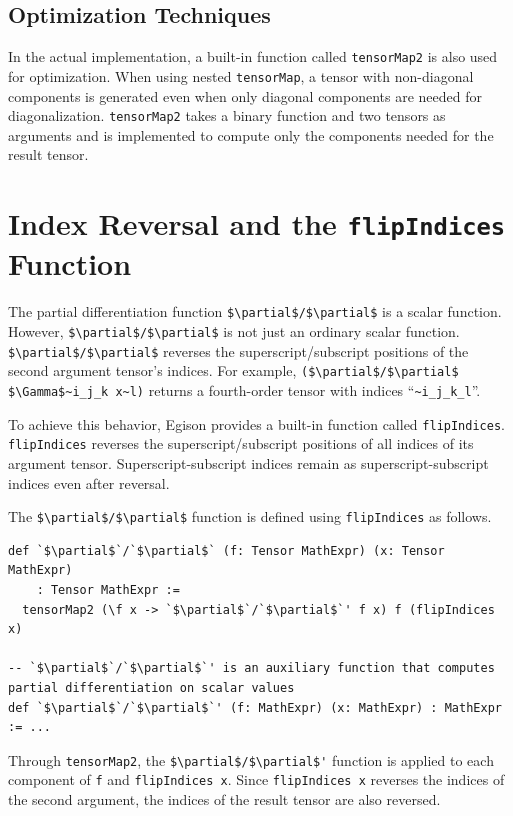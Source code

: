 \subsection{Optimization Techniques}

In the actual implementation, a built-in function called \lstinline{tensorMap2} is also used for optimization.
When using nested \lstinline{tensorMap}, a tensor with non-diagonal components is generated even when only diagonal components are needed for diagonalization.
\lstinline{tensorMap2} takes a binary function and two tensors as arguments and is implemented to compute only the components needed for the result tensor.

\section{Index Reversal and the \texttt{flipIndices} Function}

The partial differentiation function \lstinline[mathescape]!$\partial$/$\partial$! is a scalar function.
However, \lstinline[mathescape]!$\partial$/$\partial$! is not just an ordinary scalar function.
\lstinline[mathescape]!$\partial$/$\partial$! reverses the superscript/subscript positions of the second argument tensor's indices.
For example, \lstinline[mathescape]|($\partial$/$\partial$ $\Gamma$~i_j_k x~l)| returns a fourth-order tensor with indices ``\lstinline|~i_j_k_l|''.

To achieve this behavior, Egison provides a built-in function called \lstinline{flipIndices}.
\lstinline{flipIndices} reverses the superscript/subscript positions of all indices of its argument tensor.
Superscript-subscript indices remain as superscript-subscript indices even after reversal.

The \lstinline[mathescape]!$\partial$/$\partial$! function is defined using \lstinline{flipIndices} as follows.
\begin{lstlisting}[language=egison,numbers=none]
def `$\partial$`/`$\partial$` (f: Tensor MathExpr) (x: Tensor MathExpr)
    : Tensor MathExpr :=
  tensorMap2 (\f x -> `$\partial$`/`$\partial$`' f x) f (flipIndices x)

-- `$\partial$`/`$\partial$`' is an auxiliary function that computes partial differentiation on scalar values
def `$\partial$`/`$\partial$`' (f: MathExpr) (x: MathExpr) : MathExpr := ...
\end{lstlisting}

Through \lstinline{tensorMap2}, the \lstinline[mathescape]!$\partial$/$\partial$'! function is applied to each component of \lstinline{f} and \lstinline{flipIndices x}.
Since \lstinline{flipIndices x} reverses the indices of the second argument, the indices of the result tensor are also reversed.

